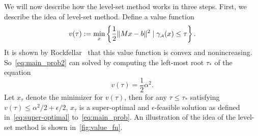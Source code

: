 We will now describe how the level-set method works in three steps. First, we describe the idea of level-set method. Define a value function
\begin{equation} \label{eq:value-fn}
  v(\tau) := \min_{x}\left\{\frac{1}{2}\|Mx - b\|^2 \mid \gamma_{\scriptscriptstyle\mathcal{A}}(x) \leq \tau\right\}. 
\end{equation} 
It is shown by Rockfellar~\cite[Theorem~5.3]{rockafellar1970convex} that this value function is convex and nonincreasing. So~\eqref{eq:main_prob2} can solved by computing the left-most root $\tau_*$ of the equation
\begin{equation} \label{eq:root}
  v(\tau) = \frac{1}{2}\alpha^2.
\end{equation}
Let $x_{\tau}$ denote the minimizer for $v(\tau)$, then for any $\tau \leq \tau_*$ satisfying $v(\tau) \leq \alpha^2/2 + \epsilon/2$, $x_\tau$ is a super-optimal and $\epsilon$-feasible solution as defined in~\eqref{eq:super-optimal} to~\eqref{eq:main_prob}. An illustration of the idea of the level-set method is shown in~\autoref{fig:value_fn}. 

